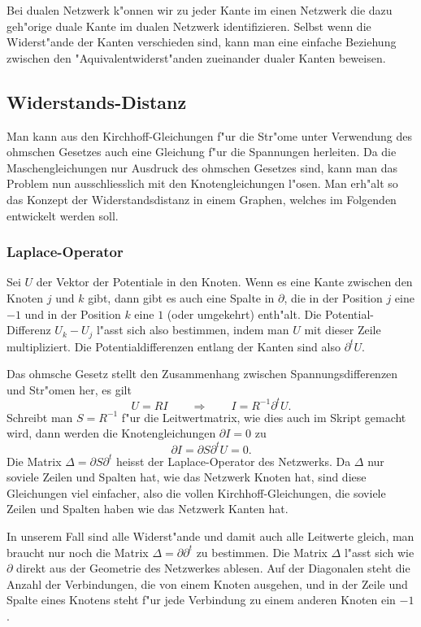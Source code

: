 \documentclass[a4paper,12pt]{article}
\begin{document}
Bei dualen Netzwerk k"onnen wir zu jeder Kante im einen Netzwerk die dazu
geh"orige duale Kante im dualen Netzwerk identifizieren.
Selbst wenn die Widerst"ande der Kanten verschieden sind, kann man
eine einfache Beziehung zwischen den "Aquivalentwiderst"anden zueinander
dualer Kanten beweisen.

\subsection{Widerstands-Distanz}
Man kann aus den Kirchhoff-Gleichungen f"ur die Str"ome unter Verwendung
des ohmschen Gesetzes auch eine Gleichung f"ur die Spannungen herleiten.
Da die Maschengleichungen nur Ausdruck des ohmschen Gesetzes sind, kann
man das Problem nun ausschliesslich mit den Knotengleichungen l"osen.
Man erh"alt so das Konzept der Widerstandsdistanz in einem Graphen,
welches im Folgenden entwickelt werden soll.

\subsubsection{Laplace-Operator}
Sei $U$ der Vektor der Potentiale in den Knoten.
Wenn es eine Kante zwischen den Knoten $j$ und $k$ gibt, dann gibt es
auch eine Spalte in $\partial$, die in der Position $j$ eine $-1$ und
in der Position $k$ eine $1$ (oder umgekehrt) enth"alt.
Die Potential-Differenz $U_k-U_j$ l"asst sich also bestimmen, indem
man $U$  mit dieser Zeile multipliziert.
Die Potentialdifferenzen entlang der Kanten sind also
$\partial^tU$.

Das ohmsche Gesetz stellt den Zusammenhang zwischen Spannungsdifferenzen
und Str"omen her, es gilt
\[
U=RI
\qquad
\Rightarrow
\qquad
I=R^{-1}\partial^t U.
\]
Schreibt man $S=R^{-1}$ f"ur die Leitwertmatrix, wie dies auch im Skript
gemacht wird, dann werden 
die Knotengleichungen $\partial I=0$ zu
\begin{equation}
\partial I=\partial S\partial^t U=0.
\label{stromgleichung}
\end{equation}
Die Matrix $\Delta=\partial S\partial^t$ heisst der Laplace-Operator des
Netzwerks.
Da $\Delta$ nur soviele Zeilen und Spalten hat, wie das Netzwerk
Knoten hat, sind diese Gleichungen viel einfacher, also die vollen
Kirchhoff-Gleichungen, die soviele Zeilen und Spalten haben wie
das Netzwerk Kanten hat.

In unserem Fall sind alle Widerst"ande und damit auch alle Leitwerte
gleich, man braucht nur noch die Matrix $\Delta=\partial\partial^t$ zu
bestimmen.
Die Matrix $\Delta$ l"asst sich wie $\partial$ direkt aus der Geometrie
des Netzwerkes ablesen.
Auf der Diagonalen steht die Anzahl der Verbindungen, die von einem
Knoten ausgehen, und in der Zeile und Spalte eines Knotens steht
f"ur jede Verbindung zu einem anderen Knoten ein $-1$.
\end{document}
